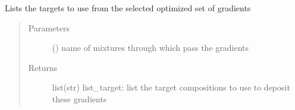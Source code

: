 \documentclass[letterpaper,10pt,english]{sphinxmanual}
\begin{document}
\begin{fulllineitems}
\label{\detokenize{ExperimentsPlannification:modules.nb_repetitions}}
\end{fulllineitems}

\label{\detokenize{ExperimentsPlannification:module-modules}}

\begin{fulllineitems}
\label{\detokenize{ExperimentsPlannification:modules.listing_targets}}
\sphinxAtStartPar
Lists the targets to use from the selected optimized set of gradients
\begin{quote}\begin{description}
\item[{Parameters}] \leavevmode
\sphinxAtStartPar
{} () \textendash{} name of mixtures through which pass the gradients

\item[{Returns}] \leavevmode
\sphinxAtStartPar
list(str) list\_target: list the target compositions to use to deposit these gradients

\end{description}\end{quote}

\end{fulllineitems}

\label{\detokenize{ExperimentsPlannification:module-modules}}
\end{document}
